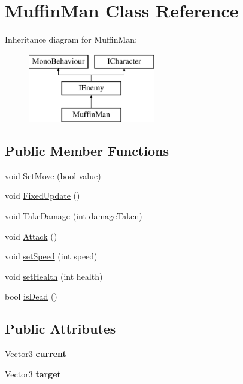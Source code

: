 \hypertarget{class_muffin_man}{}\section{Muffin\+Man Class Reference}
\label{class_muffin_man}
Inheritance diagram for Muffin\+Man\+:\begin{figure}[H]
\begin{center}
\leavevmode
\includegraphics[height=3.000000cm]{class_muffin_man}
\end{center}
\end{figure}
\subsection*{Public Member Functions}
\begin{DoxyCompactItemize}
\item 
void \mbox{\hyperlink{class_muffin_man_aa693b638b6e52ab4fed01d7113b58ca8}{Set\+Move}} (bool value)
\item 
void \mbox{\hyperlink{class_muffin_man_a4b71be125a1beefd38dffd5a35ac8526}{Fixed\+Update}} ()
\item 
void \mbox{\hyperlink{class_muffin_man_a0285a9daaa9c7285ad76570a2166733d}{Take\+Damage}} (int damage\+Taken)
\item 
void \mbox{\hyperlink{class_muffin_man_af917e1ad1d45ee23bd6b7edc5d14e0c5}{Attack}} ()
\item 
void \mbox{\hyperlink{class_muffin_man_ad8d6f582c58fed8b43fd4a7c66ce2411}{set\+Speed}} (int speed)
\item 
void \mbox{\hyperlink{class_muffin_man_a4990952946d39102b3034ee93f70f20d}{set\+Health}} (int health)
\item 
bool \mbox{\hyperlink{class_muffin_man_a0b2cb2eb97c7452da51f40af91c7b4b3}{is\+Dead}} ()
\end{DoxyCompactItemize}
\subsection*{Public Attributes}
\begin{DoxyCompactItemize}
\item 
\mbox{\label{class_muffin_man_affaf77ed95a8093c406a308399de06a1}} 
Vector3 {\bfseries current}
\item 
\mbox{\label{class_muffin_man_aafcb38688b56768770d0610ce055c165}} 
Vector3 {\bfseries target}
\end{DoxyCompactItemize}


